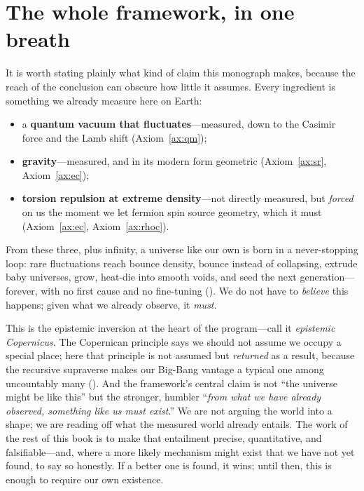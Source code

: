 \section{The whole framework, in one breath}
\label{sec:epistemic-copernicus}

It is worth stating plainly what kind of claim this monograph makes, because the
reach of the conclusion can obscure how little it assumes. Every ingredient is
something we already measure here on Earth:
\begin{itemize}
  \item a \textbf{quantum vacuum that fluctuates}---measured, down to the Casimir
    force and the Lamb shift (Axiom~\ref{ax:qm});
  \item \textbf{gravity}---measured, and in its modern form geometric
    (Axiom~\ref{ax:sr}, Axiom~\ref{ax:ec});
  \item \textbf{torsion repulsion at extreme density}---not directly measured, but
    \emph{forced} on us the moment we let fermion spin source geometry, which it must
    (Axiom~\ref{ax:ec}, Axiom~\ref{ax:rhoc}).
\end{itemize}
From these three, plus infinity, a universe like our own is born in a never-stopping
loop: rare fluctuations reach bounce density, bounce instead of collapsing, extrude
baby universes, grow, heat-die into smooth voids, and seed the next generation---
forever, with no first cause and no fine-tuning (). We do not
have to \emph{believe} this happens; given what we already observe, it \emph{must}.

This is the epistemic inversion at the heart of the program---call it
\emph{epistemic Copernicus}. The Copernican principle says we should not assume we
occupy a special place; here that principle is not assumed but \emph{returned} as a
result, because the recursive supraverse makes our Big-Bang vantage a typical one
among uncountably many (). And the framework's central claim is
not ``the universe might be like this'' but the stronger, humbler ``\emph{from what
we have already observed, something like us must exist}.'' We are not arguing the
world into a shape; we are reading off what the measured world already entails. The
work of the rest of this book is to make that entailment precise, quantitative, and
falsifiable---and, where a more likely mechanism might exist that we have not yet
found, to say so honestly. If a better one is found, it wins; until then, this is
enough to require our own existence.
